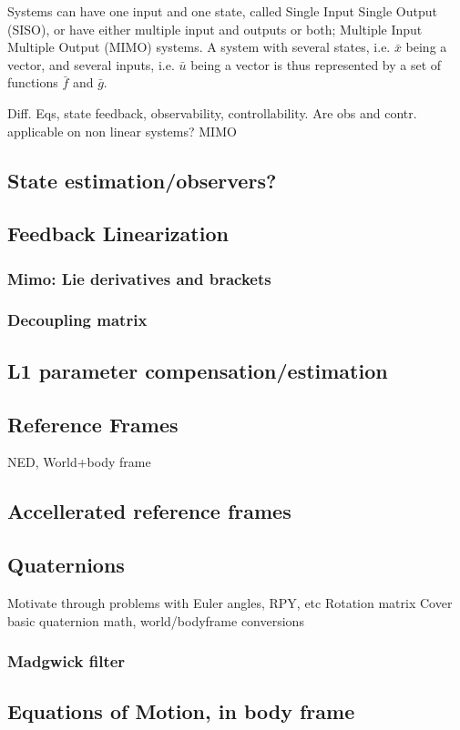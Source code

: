 \documentclass{article}
\begin{document}
Systems can have one input and one state, called Single Input Single Output (SISO), or have either multiple input and outputs or both; Multiple Input Multiple Output (MIMO) systems.
A system with several states, i.e. $\bar{x}$ being a vector, and several inputs, i.e. $\bar{u}$ being a vector is thus represented by a set of functions $\bar{f}$ and $\bar{g}$.

Diff. Eqs, state feedback, observability, controllability.
Are obs and contr. applicable on non linear systems?
MIMO
\subsection{State estimation/observers?}
\subsection{Feedback Linearization}
\subsubsection{Mimo: Lie derivatives and brackets}
\subsubsection{Decoupling matrix}
\subsection{L1 parameter compensation/estimation}
\subsection{Reference Frames}
NED, World+body frame
\subsection{Accellerated reference frames}
\subsection{Quaternions}
Motivate through problems with Euler angles, RPY, etc
Rotation matrix
Cover basic quaternion math,
world/bodyframe conversions
\subsubsection{Madgwick filter}
\subsection{Equations of Motion, in body frame}
\end{document}
